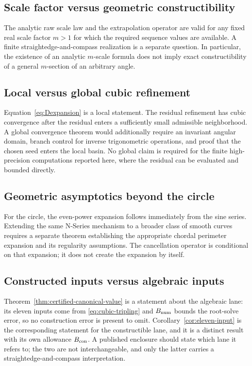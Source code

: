 \documentclass[12pt]{article}
\theoremstyle{definition}
\theoremstyle{remark}
\begin{document}
\subsection{Scale factor versus geometric constructibility}

The analytic raw scale law and the extrapolation operator are valid for any
fixed real scale factor $m>1$ for which the required sequence values are
available.  A finite straightedge-and-compass realization is a separate
question.  In particular, the existence of an analytic $m$-scale formula does
not imply exact constructibility of a general $m$-section of an arbitrary
angle.

\subsection{Local versus global cubic refinement}

Equation~\eqref{eq:Dexpansion} is a local statement.  The residual refinement
has cubic convergence after the residual enters a sufficiently small
admissible neighborhood.  A global convergence theorem would additionally
require an invariant angular domain, branch control for inverse trigonometric
operations, and proof that the chosen seed enters the local basin.  No global
claim is required for the finite high-precision computations reported here,
where the residual can be evaluated and bounded directly.

\subsection{Geometric asymptotics beyond the circle}

For the circle, the even-power expansion follows immediately from the sine
series.  Extending the same N-Series mechanism to a broader class of smooth
curves requires a separate theorem establishing the appropriate chordal
perimeter expansion and its regularity assumptions.  The cancellation operator
is conditional on that expansion; it does not create the expansion by itself.

\subsection{Constructed inputs versus algebraic inputs}

Theorem~\ref{thm:certified-canonical-value} is a statement about the algebraic
lane: its eleven inputs come from \eqref{eq:cubic-tripling} and $B_{\rm num}$
bounds the root-solve error, so no construction error is present to omit.
Corollary~\ref{cor:eleven-input} is the corresponding statement for the
constructible lane, and it is a distinct result with its own allowance
$B_{\rm con}$.  A published enclosure should state which lane it refers to; the
two are not interchangeable, and only the latter carries a straightedge-and-compass
interpretation.
\end{document}
